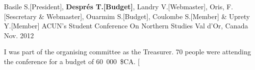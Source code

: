 \begin{cventries}
\cventry
    {Basile S.[President], \textbf{Després T.[Budget]}, Landry
      V.[Webmaster], Oris, F.[Sescretary \& Webmaster], Ouarmim S.[Budget],
      Coulombe S.[Member] \& Uprety Y.[Member]}
    {ACUN's Student Conference On Northern Studies}
    {Val d'Or, Canada}
    {Nov. 2012}
    {
      \begin{cvitems}
      \item []{I was part of the organising committee  as the
          Treasurer. 70 people were attending the conference for a budget of 60~000~\$CA. {\href{http://www.uqat.ca/sce2012/?lang=en\&menu=home}{[\color[rgb]{0,0,1}{\textbf{http://www.uqat.ca/sce2012/?lang=en\&menu=home}]}}}}
      \end{cvitems}
    }  
 \end{cventries}
